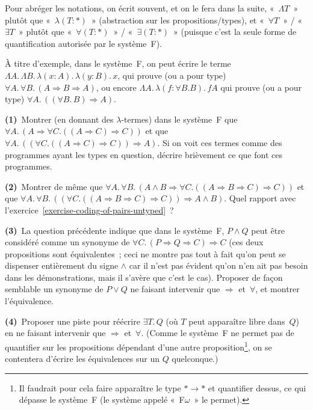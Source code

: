 \documentclass[12pt,a4paper]{article}
\theoremstyle{definition}
\begin{document}
Pour abréger les notations, on écrit souvent, et on le fera dans la
suite, « $\Lambda T$ » plutôt que « $\lambda(T:*)$ » (abstraction sur
les propositions/types), et « $\forall T$ » / « $\exists T$ » plutôt
que « $\forall(T:*)$ » / « $\exists(T:*)$ » (puisque c'est la seule
forme de quantification autorisée par le système F).

À titre d'exemple, dans le système F, on peut écrire le terme $\Lambda
A.\, \Lambda B.\, \lambda(x:A).\, \lambda(y:B).\, x$, qui prouve (ou a
pour type) $\forall A.\, \forall B.\, (A\Rightarrow B\Rightarrow A)$,
ou encore $\Lambda A.\, \lambda(f:\forall B.B).\, fA$ qui prouve (ou a
pour type) $\forall A.\, ((\forall B.\, B) \Rightarrow A)$.

\smallskip

\textbf{(1)} Montrer (en donnant des $\lambda$-termes) dans le
système F que $\forall A.\,(A \Rightarrow \forall C.((A\Rightarrow
C)\Rightarrow C))$ et que $\forall A.\,((\forall C.((A\Rightarrow
C)\Rightarrow C)) \Rightarrow A)$.  Si on voit ces termes comme des
programmes ayant les types en question, décrire brièvement ce que font
ces programmes.

\textbf{(2)} Montrer de même que $\forall A.\,\forall B.\,(A\land B
\Rightarrow \forall C.((A\Rightarrow B\Rightarrow C)\Rightarrow C))$
et que $\forall A.\,\forall B.\,((\forall C.((A\Rightarrow
B\Rightarrow C)\Rightarrow C)) \Rightarrow A\land B)$.  Quel rapport
avec l'exercice \ref{exercise-coding-of-pairs-untyped} ?

\textbf{(3)} La question précédente indique que dans le système F,
$P\land Q$ peut être considéré comme un synonyme de $\forall C.\,
(P\Rightarrow Q\Rightarrow C)\Rightarrow C$ (ces deux propositions
sont équivalentes ; ceci ne montre pas tout à fait qu'on peut se
dispenser entièrement du signe $\land$ car il n'est pas évident qu'on
n'en ait pas besoin dans les démonstrations, mais il s'avère que c'est
le cas).  Proposer de façon semblable un synonyme de $P\lor Q$ ne
faisant intervenir que $\Rightarrow$ et $\forall$, et montrer
l'équivalence.

\textbf{(4)} Proposer une piste pour réécrire $\exists T.\,Q$ (où $T$
peut apparaître libre dans $Q$) en ne faisant intervenir que
$\Rightarrow$ et $\forall$.  (Comme le système F ne permet pas de
quantifier sur les propositions dépendant d'une autre
proposition\footnote{Il faudrait pour cela faire apparaître le type
$*\to *$ et quantifier dessus, ce qui dépasse le système F (le système
appelé « F$\omega$ » le permet).}, on se contentera d'écrire les
équivalences sur un $Q$ quelconque.)
\end{document}
